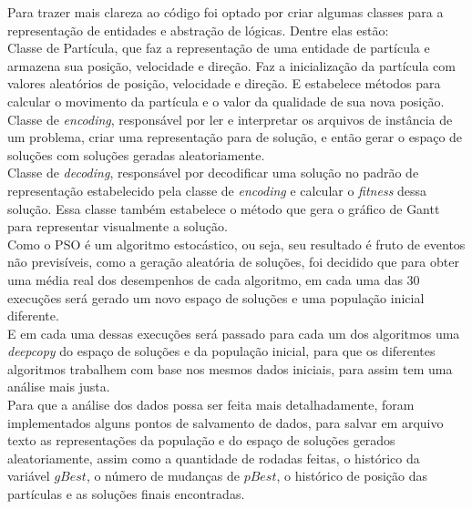 Para trazer mais clareza ao código foi optado por criar algumas classes para a representação de entidades e abstração de lógicas. Dentre elas estão:\\

\indent Classe de Partícula, que faz a representação de uma entidade de partícula e armazena sua posição, velocidade e direção. Faz a inicialização da partícula com valores aleatórios de posição, velocidade e direção. E estabelece métodos para calcular o movimento da partícula e o valor da qualidade de sua nova posição.\\
\indent Classe de \textit{encoding}, responsável por ler e interpretar os arquivos de instância de um problema, criar uma representação para de solução, e então gerar o espaço de soluções com soluções geradas aleatoriamente.\\
\indent Classe de \textit{decoding}, responsável por decodificar uma solução no padrão de representação estabelecido pela classe de \textit{encoding} e calcular o \textit{fitness} dessa solução. Essa classe também estabelece o método que gera o gráfico de Gantt para representar visualmente a solução.\\
\indent Como o PSO é um algoritmo estocástico, ou seja, seu resultado é fruto de eventos não previsíveis, como a geração aleatória de soluções, foi decidido que para obter uma média real dos desempenhos de cada algoritmo, em cada uma das 30 execuções será gerado um novo espaço de soluções e uma população inicial diferente.\\
\indent E em cada uma dessas execuções será passado para cada um dos algoritmos uma \textit{deepcopy} do espaço de soluções e da população inicial, para que os diferentes algoritmos trabalhem com base nos mesmos dados iniciais, para assim tem uma análise mais justa.\\
\indent Para que a análise dos dados possa ser feita mais detalhadamente, foram implementados alguns pontos de salvamento de dados, para salvar em arquivo texto as representações da população e do espaço de soluções gerados aleatoriamente, assim como a quantidade de rodadas feitas, o histórico da variável $gBest$, o número de mudanças de $pBest$, o histórico de posição das partículas e as soluções finais encontradas.
%
    

